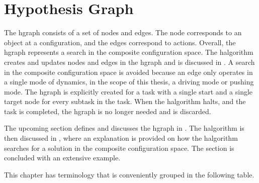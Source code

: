 \section{Hypothesis Graph}%
\label{sec:hgraph}
The \acf{hgraph} consists of a set of nodes and edges. The node corresponds to an object at a configuration, and the edges correspond to actions. Overall, the \ac{hgraph} represents a search in the composite configuration space. The \ac{halgorithm} creates and updates nodes and edges in the \ac{hgraph} and is discussed in . A search in the composite configuration space is avoided because an edge only operates in a single mode of dynamics, in the scope of this thesis, a driving mode or pushing mode. The \ac{hgraph} is explicitly created for a task with a single start and a single target node for every subtask in the task. When the \ac{halgorithm} halts, and the task is completed, the \ac{hgraph} is no longer needed and is discarded.\bs

The upcoming section defines and discusses the \ac{hgraph} in . The \ac{halgorithm} is then discussed in , where an explanation is provided on how the \ac{halgorithm} searches for a solution in the composite configuration space. The section is concluded with an extensive example.\bs




This chapter has terminology that is conveniently grouped in the following table.

